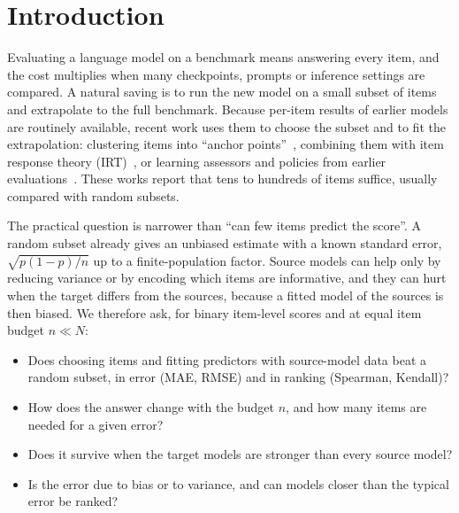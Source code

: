 \section{Introduction}
\label{sec:intro}

Evaluating a language model on a benchmark means answering every item, and the cost multiplies when many checkpoints, prompts or inference settings are compared. A natural saving is to run the new model on a small subset of items and extrapolate to the full benchmark. Because per-item results of earlier models are routinely available, recent work uses them to choose the subset and to fit the extrapolation: clustering items into ``anchor points''~\citep{vivek2024anchor}, combining them with item response theory (IRT)~\citep{mauricio2024tiny,kipnis2025metabench}, or learning assessors and policies from earlier evaluations~\citep{pacchiardi2024100,li2025active}. These works report that tens to hundreds of items suffice, usually compared with random subsets.

The practical question is narrower than ``can few items predict the score''. A random subset already gives an unbiased estimate with a known standard error, $\sqrt{p(1-p)/n}$ up to a finite-population factor. Source models can help only by reducing variance or by encoding which items are informative, and they can hurt when the target differs from the sources, because a fitted model of the sources is then biased. We therefore ask, for binary item-level scores and at equal item budget $n\ll N$:
\begin{itemize}\setlength\itemsep{0pt}
\item[\textbf{Q1}] Does choosing items and fitting predictors with source-model data beat a random subset, in error (MAE, RMSE) and in ranking (Spearman, Kendall)?
\item[\textbf{Q2}] How does the answer change with the budget $n$, and how many items are needed for a given error?
\item[\textbf{Q3}] Does it survive when the target models are stronger than every source model?
\item[\textbf{Q4}] Is the error due to bias or to variance, and can models closer than the typical error be ranked?
\end{itemize}

